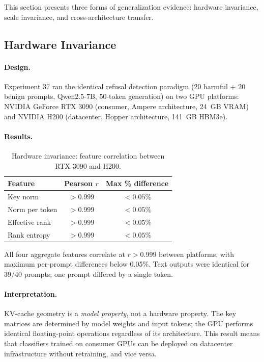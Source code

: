 This section presents three forms of generalization evidence: hardware invariance, scale invariance, and cross-architecture transfer.

\subsection{Hardware Invariance}
\label{sec:hardware}

\paragraph{Design.} Experiment 37 ran the identical refusal detection paradigm (20 harmful + 20 benign prompts, Qwen2.5-7B, 50-token generation) on two GPU platforms: NVIDIA GeForce RTX 3090 (consumer, Ampere architecture, 24~GB VRAM) and NVIDIA H200 (datacenter, Hopper architecture, 141~GB HBM3e).

\paragraph{Results.}

\begin{table}[H]
\centering
\caption{Hardware invariance: feature correlation between RTX 3090 and H200.}
\label{tab:hardware}
\begin{tabular}{lcc}
\toprule
\textbf{Feature} & \textbf{Pearson $r$} & \textbf{Max \% difference} \\
\midrule
Key norm & $> 0.999$ & $< 0.05\%$ \\
Norm per token & $> 0.999$ & $< 0.05\%$ \\
Effective rank & $> 0.999$ & $< 0.05\%$ \\
Rank entropy & $> 0.999$ & $< 0.05\%$ \\
\bottomrule
\end{tabular}
\end{table}

All four aggregate features correlate at $r > 0.999$ between platforms, with maximum per-prompt differences below 0.05\%. Text outputs were identical for 39/40 prompts; one prompt differed by a single token.

\paragraph{Interpretation.} KV-cache geometry is a \emph{model property}, not a hardware property. The key matrices are determined by model weights and input tokens; the GPU performs identical floating-point operations regardless of its architecture. This result means that classifiers trained on consumer GPUs can be deployed on datacenter infrastructure without retraining, and vice versa.

